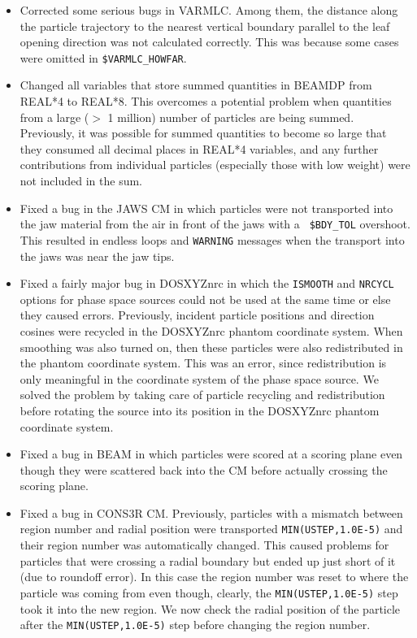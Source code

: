 \documentclass[12pt,twoside]{article}
\begin{document}
\begin{itemize}
\item Corrected some serious bugs in VARMLC.  Among them, the distance
along the particle trajectory to the nearest vertical boundary parallel
to the leaf opening direction was not calculated correctly.  This was
because some cases were omitted in {\tt \$VARMLC\_HOWFAR}.

\item Changed all variables that store summed quantities in BEAMDP from
REAL*4 to REAL*8.  This overcomes a potential problem when quantities
from a large ($>$ 1 million) number of particles are being summed.
Previously, it was possible for summed quantities to become so large that
they consumed all decimal places in REAL*4 variables, and any further
contributions from individual particles (especially those with low weight)
were not included in the sum.

\item Fixed a bug in the JAWS CM in which particles were not transported
into the jaw material from the air in front of the jaws  with a {\tt
\$BDY\_TOL} overshoot.  This resulted in endless loops and {\tt WARNING}
messages when the transport into the jaws was near the jaw tips.

\item Fixed a fairly major bug in DOSXYZnrc in which the {\tt ISMOOTH}
and {\tt NRCYCL} options for phase space sources could not be used at
the same time or else they caused errors.  Previously, incident particle
positions and direction cosines were recycled in the DOSXYZnrc phantom
coordinate system.  When smoothing was also turned on, then these
particles were also redistributed in the phantom coordinate system.
This was an error, since redistribution is only meaningful in the
coordinate system of the phase space source.  We solved the problem by
taking care of particle recycling and redistribution before rotating
the source into its position in the DOSXYZnrc phantom coordinate system.

\item Fixed a bug in BEAM in which particles were scored at a scoring
plane even though they were scattered back into the CM before
actually crossing the scoring plane.

\item Fixed a bug in CONS3R CM.  Previously, particles with a
mismatch between region number and radial position were transported
{\tt MIN(USTEP,1.0E-5)} and their region number was automatically changed.
This caused problems for particles that were crossing a radial boundary
but ended up just short of it (due to roundoff error).  In this case
the region number was reset to where the particle was coming from even though,
clearly, the {\tt MIN(USTEP,1.0E-5)} step took it into the new region.  We
now check the radial position of the particle after the {\tt MIN(USTEP,1.0E-5)}
step before changing the region number.

\end{itemize}
\end{document}
